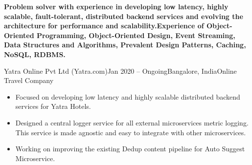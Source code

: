 \documentclass[10pt,a4paper,ragged2e]{altacv}
\begin{document}

\begin{fullwidth}
\makecvheader
\end{fullwidth}


\textbf{Problem solver with experience in developing low latency, highly scalable, fault-tolerant, distributed backend services and evolving the architecture for performance and scalability.Experience of Object-Oriented Programming, Object-Oriented Design, Event Streaming, Data Structures and Algorithms, Prevalent Design Patterns, Caching, NoSQL, RDBMS. }

{Yatra Online Pvt Ltd (Yatra.com)}{Jan 2020 -- Ongoing}{Bangalore, India}{Online Travel Company}
\begin{itemize}
\item Focused on developing low latency and highly scalable distributed backend services for Yatra Hotels.
\item Designed a central logger service for all external microservices metric logging. This service is made agnostic and easy to integrate with other microservices.
\item Working on improving the existing Dedup content pipeline for Auto Suggest Microservice.
\end{itemize}
\divider
\end{document}
